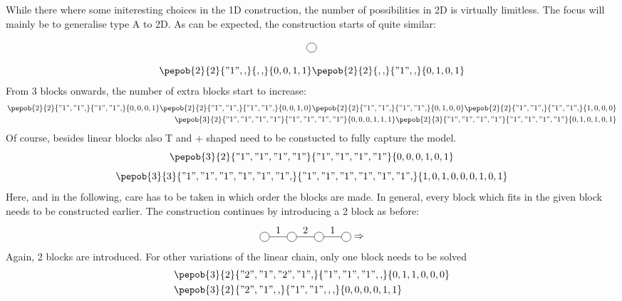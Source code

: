 While there where some initeresting choices in the 1D construction, the number of possibilities in 2D is virtually limitless. The focus will mainly be to generalise type A to 2D. As can be expected, the construction starts of quite similar:

\begin{equation}
  \mpob{1}{ {,}  }{}{}{}{{,,}}
\end{equation}

\begin{equation}
  \pepob{2}{2}{{"1",,}}{{,,}}{{0,0,1,1}}  \pepob{2}{2}{{,,}}{{"1",,}}{{0,1,0,1}}
\end{equation}
From 3 blocks onwards, the number of extra blocks start to increase:
\begin{equation}
  \begin{split}
    \pepob{2}{2}{{"1","1",}}{{"1","1",}}{{0,0,0,1}}  \pepob{2}{2}{{"1","1",}}{{"1","1",}}{{0,0,1,0}}\pepob{2}{2}{{"1","1",}}{{"1","1",}}{{0,1,0,0}} \pepob{2}{2}{{"1","1",}}{{"1","1",}}{{1,0,0,0}}\\
    \pepob{3}{2}{{"1","1","1","1"}}{{"1","1","1","1"}}{{0,0,0,1,1,1}} \pepob{2}{3}{{"1","1","1","1"}}{{"1","1","1","1"}}{{0,1,0,1,0,1}}
  \end{split}
\end{equation}
Of course, besides linear blocks also T and + shaped need to be constucted to fully capture the model.
\begin{equation}
  \pepob{3}{2}{{"1","1","1","1"}}{{"1","1","1","1"}}{{0,0,0,1,0,1}}
\end{equation}
\begin{equation}
  \pepob{3}{3}{{"1","1","1","1","1","1",}}{{"1","1","1","1","1","1",}}{{1,0,1,0,0,0,1,0,1}}
\end{equation}
Here, and in the following, care has to be taken in which order the blocks are made. In general, every block which fits in the given block needs to be constructed earlier. The construction continues by introducing a 2 block as before:
\begin{equation}
  \mpob{4}{ {,"1","2","1",}  }{}{}{}{{,,,,,}} \Rightarrow
\end{equation}
Again, 2 blocks are introduced. For other variations of the linear chain, only one block needs to be solved
\begin{equation}
  \begin{split}
    &\pepob{3}{2}{{"2","1","2","1",}}{{"1","1","1",,}}{{0,1,1,0,0,0}}\\
    &\pepob{3}{2}{{"2","1",,}}{{"1","1",,,}}{{0,0,0,0,1,1}}
  \end{split}
\end{equation}

